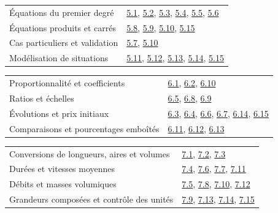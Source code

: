 \begin{tabularx}{\linewidth}{@{}Yl@{}}\toprule
Équations du premier degré & \hyperref[exo-5-1]{5.1}, \hyperref[exo-5-2]{5.2}, \hyperref[exo-5-3]{5.3}, \hyperref[exo-5-4]{5.4}, \hyperref[exo-5-5]{5.5}, \hyperref[exo-5-6]{5.6}\\[2mm]
Équations produits et carrés & \hyperref[exo-5-8]{5.8}, \hyperref[exo-5-9]{5.9}, \hyperref[exo-5-10]{5.10}, \hyperref[exo-5-15]{5.15}\\[2mm]
Cas particuliers et validation & \hyperref[exo-5-7]{5.7}, \hyperref[exo-5-10]{5.10}\\[2mm]
Modélisation de situations & \hyperref[exo-5-11]{5.11}, \hyperref[exo-5-12]{5.12}, \hyperref[exo-5-13]{5.13}, \hyperref[exo-5-14]{5.14}, \hyperref[exo-5-15]{5.15}\\[2mm]
\bottomrule\end{tabularx}\par\vspace{4mm}
\begin{tabularx}{\linewidth}{@{}Yl@{}}\toprule
Proportionnalité et coefficients & \hyperref[exo-6-1]{6.1}, \hyperref[exo-6-2]{6.2}, \hyperref[exo-6-10]{6.10}\\[2mm]
Ratios et échelles & \hyperref[exo-6-5]{6.5}, \hyperref[exo-6-8]{6.8}, \hyperref[exo-6-9]{6.9}\\[2mm]
Évolutions et prix initiaux & \hyperref[exo-6-3]{6.3}, \hyperref[exo-6-4]{6.4}, \hyperref[exo-6-6]{6.6}, \hyperref[exo-6-7]{6.7}, \hyperref[exo-6-14]{6.14}, \hyperref[exo-6-15]{6.15}\\[2mm]
Comparaisons et pourcentages emboîtés & \hyperref[exo-6-11]{6.11}, \hyperref[exo-6-12]{6.12}, \hyperref[exo-6-13]{6.13}\\[2mm]
\bottomrule\end{tabularx}\par\vspace{4mm}
\clearpage
{}\fontsize{10}{13}\selectfont
{}\begin{tabularx}{\linewidth}{@{}Yl@{}}\toprule
Conversions de longueurs, aires et volumes & \hyperref[exo-7-1]{7.1}, \hyperref[exo-7-2]{7.2}, \hyperref[exo-7-3]{7.3}\\[2mm]
Durées et vitesses moyennes & \hyperref[exo-7-4]{7.4}, \hyperref[exo-7-6]{7.6}, \hyperref[exo-7-7]{7.7}, \hyperref[exo-7-11]{7.11}\\[2mm]
Débits et masses volumiques & \hyperref[exo-7-5]{7.5}, \hyperref[exo-7-8]{7.8}, \hyperref[exo-7-10]{7.10}, \hyperref[exo-7-12]{7.12}\\[2mm]
Grandeurs composées et contrôle des unités & \hyperref[exo-7-9]{7.9}, \hyperref[exo-7-13]{7.13}, \hyperref[exo-7-14]{7.14}, \hyperref[exo-7-15]{7.15}\\[2mm]
\bottomrule\end{tabularx}\par\vspace{4mm}
